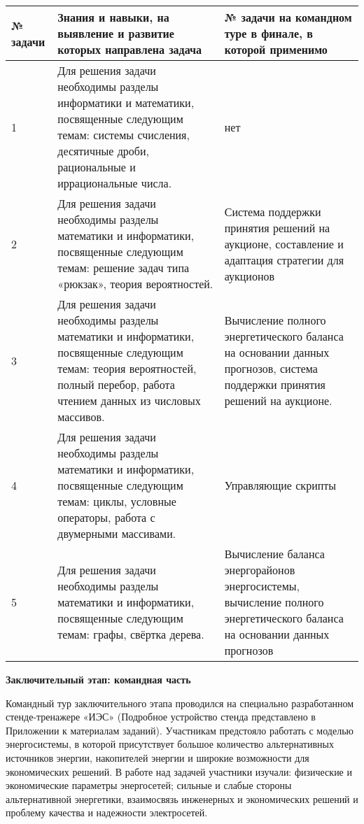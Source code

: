 \begin{center}
\small
\begin{longtable}{|p{2cm}|p{7cm}|p{6cm}|}
\hline
\textbf{№ задачи}&\textbf{Знания и навыки, на выявление и развитие которых направлена задача}&\textbf{№ задачи на командном туре в финале, в которой применимо} \\
\hline
1& Для решения задачи необходимы разделы информатики и математики, посвященные следующим темам: системы счисления, десятичные дроби, рациональные и иррациональные числа.& нет\\
\hline
2& Для решения задачи необходимы разделы математики и информатики, посвященные следующим темам: решение задач типа «рюкзак», теория вероятностей.& Система поддержки принятия решений на аукционе, составление и адаптация стратегии для аукционов\\
\hline
3& Для решения задачи необходимы разделы математики и информатики, посвященные следующим темам: теория вероятностей, полный перебор, работа чтением данных из числовых массивов.& Вычисление полного энергетического баланса на основании данных прогнозов, система поддержки принятия решений на аукционе.\\
\hline
4& Для решения задачи необходимы разделы математики и информатики, посвященные следующим темам: циклы, условные операторы, работа с двумерными массивами.& Управляющие скрипты\\
\hline
5& Для решения задачи необходимы разделы математики и информатики, посвященные следующим темам: графы, свёртка дерева.& Вычисление баланса энергорайонов энергосистемы, вычисление полного энергетического баланса на основании данных прогнозов \\
\hline
\end{longtable}
\end{center}

\textbf{Заключительный этап: командная часть}

Командный тур заключительного этапа проводился на специально разработанном стенде-тренажере «ИЭС» (Подробное устройство стенда представлено в Приложении к материалам заданий). Участникам предстояло работать с моделью энергосистемы, в которой присутствует большое количество альтернативных источников энергии, накопителей энергии и широкие возможности для экономических решений. В работе над задачей участники изучали: физические и экономические параметры энергосетей; сильные и слабые стороны альтернативной энергетики, взаимосвязь инженерных и экономических решений и проблему качества и надежности электросетей.

